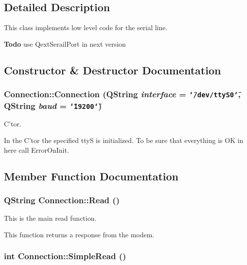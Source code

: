 \subsection{Detailed Description}
This class implements low level code for the serial line.

\begin{Desc}
\item[{\bf Todo}]use Qext\-Serail\-Port in next version \end{Desc}




\subsection{Constructor \& Destructor Documentation}
\subsubsection{\setlength{\rightskip}{0pt plus 5cm}Connection::Connection (QString {\em interface} = {\tt \char`\"{}/dev/ttyS0\char`\"{}}, QString {\em baud} = {\tt \char`\"{}19200\char`\"{}})}\label{classConnection_a0}


C'tor. 

In the C'tor the specified tty\-S is initialized. To be sure that everything is OK in here call Error\-On\-Init. 

\subsection{Member Function Documentation}
\subsubsection{\setlength{\rightskip}{0pt plus 5cm}QString Connection::Read ()}\label{classConnection_a4}


This is the main read function. 

This function returns a response from the modem. 
\subsubsection{\setlength{\rightskip}{0pt plus 5cm}int Connection::Simple\-Read ()}\label{classConnection_a7}


